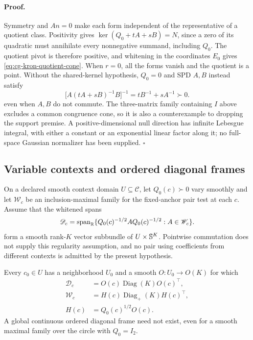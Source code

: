 \paragraph{Proof.}
Symmetry and \(An=0\) make each form independent of the representative
of a quotient class. Positivity gives
\(\ker(Q_0+tA+sB)=N\), since a zero of its quadratic must annihilate
every nonnegative summand, including \(Q_0\). The quotient pivot is
therefore positive, and whitening in the coordinates \(E_0\) gives
\eqref{eq:cg-kron-quotient-cone}. When \(r=0\), all the forms vanish
and the quotient is a point. Without the shared-kernel hypothesis,
\(Q_0=0\) and SPD \(A,B\) instead satisfy
\begin{equation}
\bigl[A(tA+sB)^{-1}B\bigr]^{-1}=tB^{-1}+sA^{-1}\succ0.
\label{eq:cg-kron-zero-anchor-parallel}
\end{equation}
even when \(A,B\) do not commute. The three-matrix family containing
\(I\) above excludes a common congruence cone, so it is also a
counterexample to dropping the support premise. A positive-dimensional
null direction has infinite Lebesgue integral, with either a constant
or an exponential linear factor along it; no full-space Gaussian
normalizer has been supplied. \(\square\)

\subsection{Variable contexts and ordered diagonal frames}
\label{sec:cg-kron-variable-context}

On a declared smooth context domain \(U\subseteq\mathcal C\), let
\(Q_0(c)\succ0\) vary smoothly and let \(\mathscr W_c\) be an
inclusion-maximal family for the fixed-anchor pair test at each \(c\).
Assume that the whitened spans
\begin{equation}
\mathscr D_c
=\operatorname{span}_{\mathbb R}
\{Q_0(c)^{-1/2}AQ_0(c)^{-1/2}:A\in\mathscr W_c\}.
\label{eq:cg-kron-context-algebra}
\end{equation}
form a smooth rank-\(K\) vector subbundle of
\(U\times\mathbb S^K\). Pointwise commutation does not supply this regularity
assumption, and no pair using coefficients from different contexts is
admitted by the present hypothesis. 

Every \(c_0\in U\) has a neighborhood \(U_0\) and a smooth
\(O:U_0\to O(K)\) for which
\begin{equation}
\begin{aligned}
\mathscr D_c&=O(c)\operatorname{Diag}(K)O(c)^\top,\\
\mathscr W_c&=H(c)\operatorname{Diag}_+(K)H(c)^\top,\\
H(c)&=Q_0(c)^{1/2}O(c).
\end{aligned}
\label{eq:cg-kron-local-context-cone}
\end{equation}
A global continuous ordered diagonal frame need not exist, even for a
smooth maximal family over the circle with \(Q_0=I_2\).

